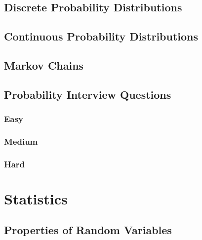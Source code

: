 \documentclass[
]{book}
\begin{document}
\hypertarget{discrete-probability-distributions}{%
\section{Discrete Probability Distributions}\label{discrete-probability-distributions}}

\hypertarget{continuous-probability-distributions}{%
\section{Continuous Probability Distributions}\label{continuous-probability-distributions}}

\hypertarget{markov-chains}{%
\section{Markov Chains}\label{markov-chains}}

\hypertarget{probability-interview-questions}{%
\section{Probability Interview Questions}\label{probability-interview-questions}}

\hypertarget{easy}{%
\subsection{Easy}\label{easy}}

\hypertarget{medium}{%
\subsection{Medium}\label{medium}}

\hypertarget{hard}{%
\subsection{Hard}\label{hard}}

\hypertarget{statistics}{%
\chapter{Statistics}\label{statistics}}

\hypertarget{properties-of-random-variables}{%
\section{Properties of Random Variables}\label{properties-of-random-variables}}
\end{document}
